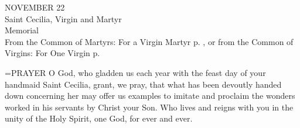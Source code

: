 \begin{center}\normalsize NOVEMBER 22\\
\footnotesize Saint Cecilia, Virgin and Martyr\\
\footnotesize Memorial\\
\footnotesize From the Common of Martyrs: For a Virgin Martyr p.   , or from the Common of\\
\footnotesize Virgins: For One Virgin p.\\
\end{center}

\hangindent=\parindent \small{PRAYER 
O God, who gladden us each year
with the feast day of your handmaid Saint Cecilia,
grant, we pray,
that what has been devoutly handed down concerning her may offer us examples to imitate
and proclaim the wonders worked in his servants
by Christ your Son.
Who lives and reigns with you in the unity of the Holy Spirit,
one God, for ever and ever.\\}
 
